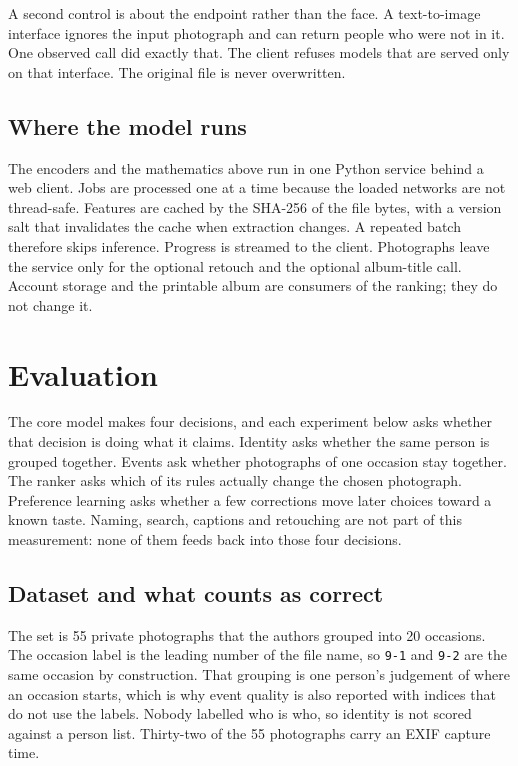 \documentclass[conference]{IEEEtran}
\begin{document}
A second control is about the endpoint rather than the face. A text-to-image
interface ignores the input photograph and can return people who were not in
it. One observed call did exactly that. The client refuses models that are
served only on that interface. The original file is never overwritten.

\subsection{Where the model runs}
\label{sec:system}

The encoders and the mathematics above run in one Python service behind a web
client. Jobs are processed one at a time because the loaded networks are not
thread-safe. Features are cached by the SHA-256 of the file bytes, with a
version salt that invalidates the cache when extraction changes. A repeated
batch therefore skips inference. Progress is streamed to the client. Photographs
leave the service only for the optional retouch and the optional album-title
call. Account storage and the printable album are consumers of the ranking;
they do not change it.

\section{Evaluation}
\label{sec:eval}

The core model makes four decisions, and each experiment below asks whether
that decision is doing what it claims. Identity asks whether the same person
is grouped together. Events ask whether photographs of one occasion stay
together. The ranker asks which of its rules actually change the chosen
photograph. Preference learning asks whether a few corrections move later
choices toward a known taste. Naming, search, captions and retouching are not
part of this measurement: none of them feeds back into those four decisions.

\subsection{Dataset and what counts as correct}
\label{sec:protocol}

The set is 55 private photographs that the authors grouped into 20 occasions.
The occasion label is the leading number of the file name, so \texttt{9-1}
and \texttt{9-2} are the same occasion by construction. That grouping is one
person's judgement of where an occasion starts, which is why event quality is
also reported with indices that do not use the labels. Nobody labelled who is
who, so identity is not scored against a person list. Thirty-two of the 55
photographs carry an EXIF capture time.
\end{document}

